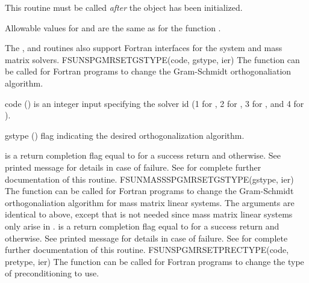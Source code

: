 {
  This routine must be called \emph{after} the {\nvector} object has
  been initialized.

  Allowable values for  and  are the same as for
  the {\CC} function \newline {}.
}
%
%
The , 
and \newline {} routines also
support Fortran interfaces for the system and mass matrix solvers.
%
%
{
  FSUNSPGMRSETGSTYPE(code, gstype, ier)
}
{
  The function  can be called for Fortran
  programs to change the Gram-Schmidt orthogonaliation algorithm.
}
{
  \begin{args}[gstype]
  \item[code] ()
    is an integer input specifying the solver id (1 for {\cvode}, 2
    for {\ida}, 3 for {\kinsol}, and 4 for {\arkode}).
  \item[gstype] ()
    flag indicating the desired orthogonalization algorithm.
  \end{args}
}
{
   is a  return completion flag equal to  for a success
  return and  otherwise. See printed message for details in case
  of failure.
}
{
  See  for complete further documentation of
  this routine. 
}
%
%
{
  FSUNMASSSPGMRSETGSTYPE(gstype, ier)
}
{
  The function  can be called for Fortran
  programs to change the Gram-Schmidt orthogonaliation algorithm for
  mass matrix linear systems.
}
{
  The arguments are identical to  above, except that
   is not needed since mass matrix linear systems only arise
  in {\arkode}.
}
{
   is a  return completion flag equal to  for a success
  return and  otherwise. See printed message for details in case
  of failure.
}
{
  See  for complete further documentation of
  this routine.
}
%
%
{
  FSUNSPGMRSETPRECTYPE(code, pretype, ier)
}
{
  The function  can be called for Fortran
  programs to change the type of preconditioning to use.
}
